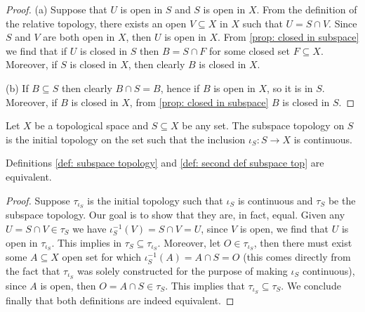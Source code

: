 \begin{proof}
    (a) Suppose that \(U\) is open in \(S\) and \(S\) is open in \(X\). From the
    definition of the relative topology, there exists an open \(V \subseteq X\) in
    \(X\) such that \(U = S \cap V\). Since \(S\) and \(V\) are both open in
    \(X\), then \(U\) is open in \(X\). From \cref{prop: closed in subspace} we
    find that if \(U\) is closed in \(S\) then \(B = S \cap F\) for some closed
    set \(F \subseteq X\). Moreover, if \(S\) is closed in \(X\), then clearly
    \(B\) is closed in \(X\).

    (b) If \(B \subseteq S\) then clearly \(B \cap S = B\), hence if \(B\) is open
    in \(X\), so it is in \(S\). Moreover, if \(B\) is closed in \(X\), from
    \cref{prop: closed in subspace} \(B\) is closed in \(S\).
\end{proof}

\begin{definition}
    \label{def: second def subspace top}
    Let \(X\) be a topological space and \(S \subseteq X\) be any set. The
    subspace topology on \(S\) is the initial topology on the set such that the
    inclusion \(\iota_S: S \to X\) is continuous.
\end{definition}

\begin{corollary}
    Definitions \ref{def: subspace topology} and \ref{def: second def subspace
        top} are equivalent.
\end{corollary}

\begin{proof}
    Suppose \(\tau_{\iota_S}\) is the initial topology such that \(\iota_S\) is
    continuous and \(\tau_S\) be the subspace topology. Our goal is to show that
    they are, in fact, equal. Given any \(U = S \cap V \in \tau_S\) we have
    \(\iota_S^{-1}(V) = S \cap V = U\), since \(V\) is open, we find that \(U\) is
    open in \(\tau_{\iota_S}\). This implies in \(\tau_S \subseteq
    \tau_{\iota_S}\). Moreover, let \(O \in \tau_{\iota_S}\), then there must exist
    some \(A \subseteq X\) open set for which \(\iota_S^{-1}(A) = A \cap S = O\)
    (this comes directly from the fact that \(\tau_{\iota_S}\) was solely
    constructed for the purpose of making \(\iota_S\) continuous), since \(A\) is
    open, then \(O = A \cap S \in \tau_S\). This implies that
    \(\tau_{\iota_S} \subseteq \tau_{S}\). We conclude finally that both
    definitions are indeed equivalent.
\end{proof}

